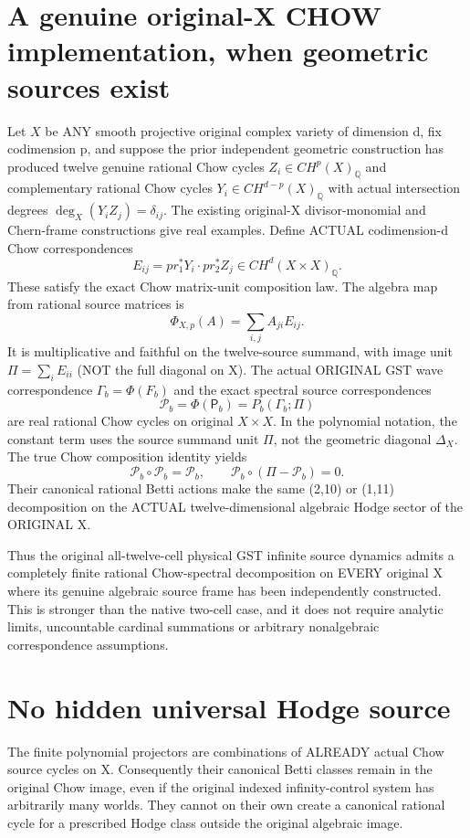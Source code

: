 \documentclass{article}
\begin{document}
\section{A genuine original-X CHOW implementation, when geometric sources exist}
Let $X$ be ANY smooth projective original complex
variety of dimension d, fix codimension p,
and suppose the prior independent geometric construction
has produced twelve genuine rational Chow cycles
$Z_i\in CH^p(X)_{\mathbb Q}$ and complementary
rational Chow cycles $Y_i\in CH^{d-p}(X)_{\mathbb Q}$
with actual intersection degrees $\deg_X(Y_iZ_j)=\delta_{ij}$.
The existing original-X divisor-monomial and
Chern-frame constructions give real examples.
Define ACTUAL codimension-d Chow correspondences
\[
E_{ij}=pr_1^*Y_i\cdot pr_2^*Z_j
\in CH^d(X\times X)_{\mathbb Q}.
\]
These satisfy the exact Chow matrix-unit
composition law. The algebra map from
rational source matrices is
\[
\Phi_{X,p}(A)=\sum_{i,j} A_{ji}E_{ij}.
\]
It is multiplicative and faithful on the twelve-source
summand, with image unit
$\Pi=\sum_i E_{ii}$ (NOT the full diagonal on X).
The actual ORIGINAL GST wave correspondence
$\Gamma_b=\Phi(F_b)$ and the exact spectral
source correspondences
\[
\boxed{\mathcal P_b=\Phi(\mathsf P_b)
=P_b(\Gamma_b;\Pi)}
\]
are real rational Chow cycles on original $X\times X$.
In the polynomial notation, the constant
term uses the source summand unit $\Pi$, not
the geometric diagonal $\Delta_X$.
The true Chow composition identity yields
\[
\mathcal P_b\circ\mathcal P_b=\mathcal P_b,
\qquad
\mathcal P_b\circ(\Pi-\mathcal P_b)=0.
\]
Their canonical rational Betti actions make
the same (2,10) or (1,11) decomposition
on the ACTUAL twelve-dimensional algebraic
Hodge sector of the ORIGINAL X.

Thus the original all-twelve-cell
physical GST infinite source dynamics
admits a completely finite rational
Chow-spectral decomposition on EVERY
original X where its genuine algebraic
source frame has been independently constructed.
This is stronger than the native two-cell
case, and it does not require analytic limits,
uncountable cardinal summations or arbitrary
nonalgebraic correspondence assumptions.

\section{No hidden universal Hodge source}
The finite polynomial projectors are combinations
of ALREADY actual Chow source cycles on X.
Consequently their canonical Betti classes
remain in the original Chow image,
even if the original indexed infinity-control
system has arbitrarily many worlds.
They cannot on their own create a canonical
rational cycle for a prescribed Hodge class
outside the original algebraic image.
\end{document}
